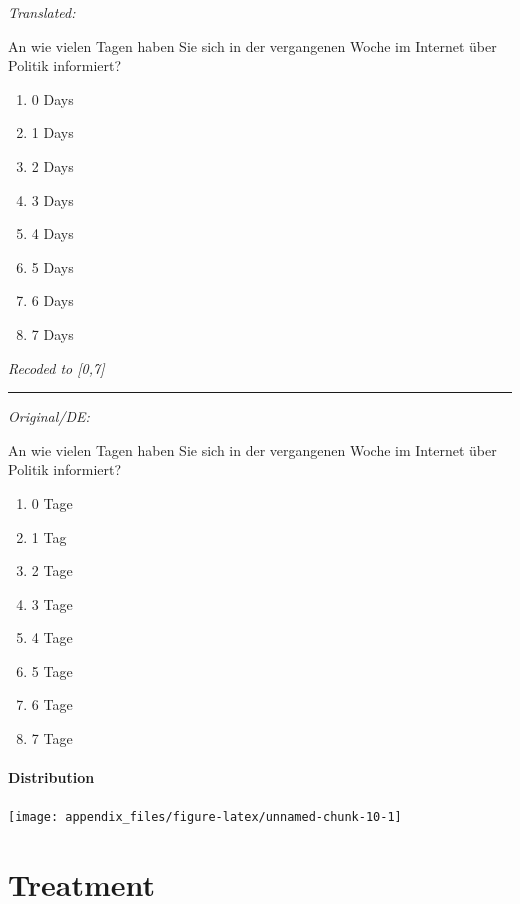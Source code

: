\documentclass[
]{article}
\providecommand{\tightlist}{%
  \setlength{\itemsep}{0pt}\setlength{\parskip}{0pt}}
\begin{document}
\emph{Translated:}

An wie vielen Tagen haben Sie sich in der vergangenen Woche im Internet über Politik informiert?

\begin{enumerate}
\def\labelenumi{(\arabic{enumi})}
\tightlist
\item
  0 Days
\item
  1 Days
\item
  2 Days
\item
  3 Days
\item
  4 Days
\item
  5 Days
\item
  6 Days
\item
  7 Days
\end{enumerate}

\emph{Recoded to {[}0,7{]}}

\begin{center}\rule{0.5\linewidth}{0.5pt}\end{center}

\emph{Original/DE:}

An wie vielen Tagen haben Sie sich in der vergangenen Woche im Internet über Politik informiert?

\begin{enumerate}
\def\labelenumi{(\arabic{enumi})}
\tightlist
\item
  0 Tage
\item
  1 Tag
\item
  2 Tage
\item
  3 Tage
\item
  4 Tage
\item
  5 Tage
\item
  6 Tage
\item
  7 Tage
\end{enumerate}

\hypertarget{distribution-7}{%
\paragraph{Distribution}\label{distribution-7}}

\begin{center}\texttt{[image: appendix\_files/figure-latex/unnamed-chunk-10-1]} \end{center}

\pagebreak

\hypertarget{treatment}{%
\section{Treatment}\label{treatment}}
\end{document}
